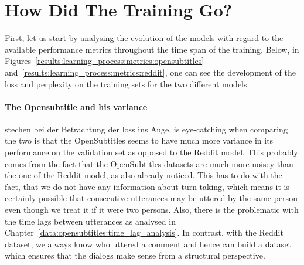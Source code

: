 \section{How Did The Training Go?}
First, let us start by analysing the evolution of the models with regard to the available performance metrics throughout the time span of the training. Below, in Figures~\ref{results:learning_process:metrics:opensubtitles} and~\ref{results:learning_process:metrics:reddit}, one can see the development of the loss and perplexity on the training sets for the two different models.

\paragraph{The Opensubtitle and his variance} stechen bei der Betrachtung der loss ins Auge. is eye-catching when comparing the two is that the OpenSubtitles seems to have much more variance in its performance on the validation set as opposed to the Reddit model. This probably comes from the fact that the OpenSubtitles datasets are much more noisey than the one of the Reddit model, as \cite{Vinyals:2015} also already noticed. This has to do with the fact, that we do not have any information about turn taking, which means it is certainly possible that consecutive utterances may be uttered by the same person even though we treat it if it were two persons. Also, there is the problematic with the time lags between utterances as analysed in Chapter~\ref{data:opensubtitles:time_lag_analysis}. In contrast, with the Reddit dataset, we always know who uttered a comment and hence can build a dataset which ensures that the dialogs make sense from a structural perspective.
